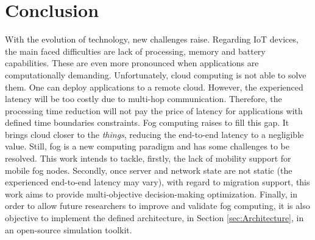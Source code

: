 \section{Conclusion}
\label{sec:Conclusion}
With the evolution of technology, new challenges raise. Regarding IoT devices, the main faced difficulties are lack of processing, memory and battery capabilities. These are even more pronounced when applications are computationally demanding. Unfortunately, cloud computing is not able to solve them. One can deploy applications to a remote cloud. However, the experienced latency will be too costly due to multi-hop communication. Therefore, the processing time reduction will not pay the price of latency for applications with defined time boundaries constraints. Fog computing raises to fill this gap. It brings cloud closer to the \textit{things}, reducing the end-to-end latency to a negligible value. Still, fog is a new computing paradigm and has some challenges to be resolved. This work intends to tackle, firstly, the lack of mobility support for mobile fog nodes. %
Secondly, once server and network state are not static (the experienced end-to-end latency may vary), with regard to migration support, this work aims to provide multi-objective decision-making optimization. Finally, in order to allow future researchers to improve and validate fog computing, it is also objective to implement the defined architecture, in Section \ref{sec:Architecture}, in an open-source simulation toolkit.
